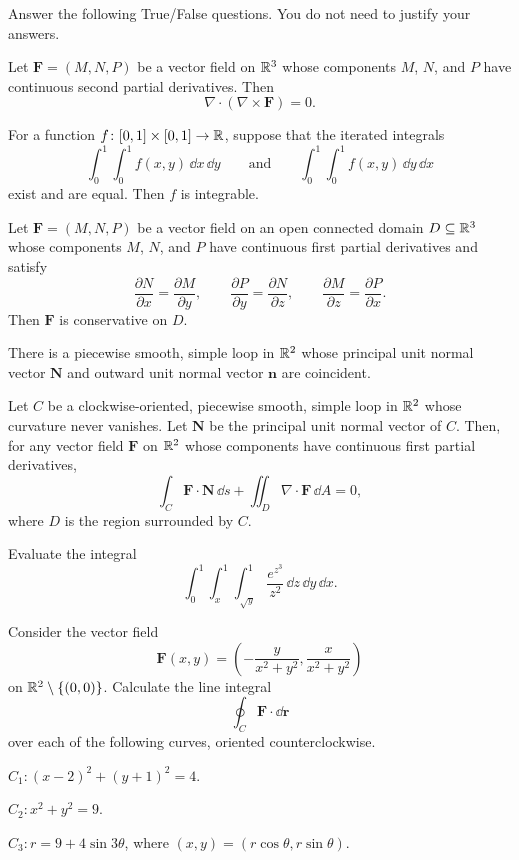 \begin{problem}
Answer the following True/False questions. You do not need to justify your answers.
\begin{problemsubparts}
\item Let $\mathbf F=(M,N,P)$ be a vector field on $\mathbb{R}^3$ whose components $M$, $N$, and $P$ have continuous second partial derivatives. Then
\[
\nabla\cdot(\nabla\times\mathbf F)=0.
\]
\item For a function $f\colon[0,1]\times[0,1]\to\mathbb{R}$, suppose that the iterated integrals
\[
\int_0^1\int_0^1 f(x,y)\,\dd x\,\dd y
\qquad\text{and}\qquad
\int_0^1\int_0^1 f(x,y)\,\dd y\,\dd x
\]
exist and are equal. Then $f$ is integrable.
\item Let $\mathbf F=(M,N,P)$ be a vector field on an open connected domain $D\subseteq\mathbb{R}^3$ whose components $M$, $N$, and $P$ have continuous first partial derivatives and satisfy
\[
\frac{\partial N}{\partial x}=\frac{\partial M}{\partial y},
\qquad
\frac{\partial P}{\partial y}=\frac{\partial N}{\partial z},
\qquad
\frac{\partial M}{\partial z}=\frac{\partial P}{\partial x}.
\]
Then $\mathbf F$ is conservative on $D$.
\item There is a piecewise smooth, simple loop in $\mathbb{R}^2$ whose principal unit normal vector $\mathbf N$ and outward unit normal vector $\mathbf n$ are coincident.
\item Let $C$ be a clockwise-oriented, piecewise smooth, simple loop in $\mathbb{R}^2$ whose curvature never vanishes. Let $\mathbf N$ be the principal unit normal vector of $C$. Then, for any vector field $\mathbf F$ on $\mathbb{R}^2$ whose components have continuous first partial derivatives,
\[
\int_C \mathbf F\cdot\mathbf N\,\dd s
+
\iint_D \nabla\cdot\mathbf F\,\dd A
=0,
\]
where $D$ is the region surrounded by $C$.
\end{problemsubparts}
\end{problem}

\begin{problem}
Evaluate the integral
\[
\int_0^1\int_x^1\int_{\sqrt y}^{1}
\frac{e^{z^3}}{z^2}\,\dd z\,\dd y\,\dd x.
\]
\end{problem}

\begin{problem}
Consider the vector field
\[
\mathbf F(x,y)=
\left(
-\frac{y}{x^2+y^2},
\frac{x}{x^2+y^2}
\right)
\]
on $\mathbb{R}^2\setminus\{(0,0)\}$. Calculate the line integral
\[
\oint_C\mathbf F\cdot\dd\mathbf r
\]
over each of the following curves, oriented counterclockwise.
\begin{problemsubparts}
\item $C_1\colon (x-2)^2+(y+1)^2=4$.
\item $C_2\colon x^2+y^2=9$.
\item $C_3\colon r=9+4\sin 3\theta$, where $(x,y)=(r\cos\theta,r\sin\theta)$.
\end{problemsubparts}
\end{problem}

